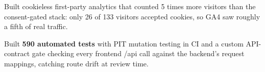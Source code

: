 \documentclass[letterpaper,10pt]{article}
\newcommand{\resumeItem}[1]{
  \item\small{
    {#1 \vspace{-3pt}}
  }
}
\begin{document}
        \resumeItem{Built cookieless first-party analytics that counted 5 times more visitors than the consent-gated stack: only 26 of 133 visitors accepted cookies, so GA4 saw roughly a fifth of real traffic.}
        \resumeItem{Built \textbf{590 automated tests} with PIT mutation testing in CI and a custom API-contract gate checking every frontend /api call against the backend's request mappings, catching route drift at review time.}
\end{document}
